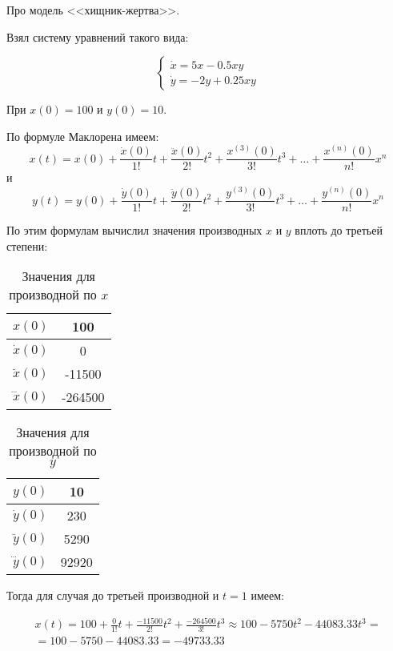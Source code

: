 \documentclass[11pt,reqno]{amsart}
\begin{document}
Про модель <<хищник-жертва>>.

Взял систему уравнений такого вида:

\begin{equation}\label{eq1}
  \begin{cases}
    \dot x = 5x - 0.5 x y \\
    \dot y = -2y+0.25xy
  \end{cases}
\end{equation}

При $x(0) = 100$ и $y(0) = 10$.

По формуле Маклорена имеем:
 $$x(t) = x(0) + \frac {\dot x(0)} {1!} t + \frac {\ddot x(0)} {2!} t^2 + \frac {x^{(3)}(0)} {3!}t^3 + \ldots + \frac {x^{(n)}(0)} {n!} x^n$$
и
$$y(t) = y(0) + \frac {\dot y(0)} {1!} t + \frac {\ddot y(0)} {2!} t^2 + \frac {y^{(3)}(0)} {3!}t^3 + \ldots + \frac {y^{(n)}(0)} {n!} x^n$$

По этим формулам вычислил значения производных $x$ и $y$ вплоть до третьей степени:

\begin{table}[h]
  \begin{tabular}{|c|c|}
    \hline
    $x(0)$ & 100 \\ \hline
    $\dot x(0)$ & 0 \\ \hline
    $\ddot x(0)$ & -11500 \\ \hline
    $\dddot x(0)$ & -264500 \\ \hline
  \end{tabular}
\caption{Значения для производной по $x$}
\end{table}

\begin{table}[h]
  \begin{tabular}{|c|c|}
    \hline
    $y(0)$ & 10 \\ \hline
    $\dot y(0)$ & 230 \\ \hline
    $\ddot y(0)$ & 5290 \\ \hline
    $\dddot y(0)$ & 92920 \\ \hline
  \end{tabular}
\caption{Значения для производной по $y$}
\end{table}

Тогда для случая до третьей производной и $t = 1$ имеем:

\begin{equation}
\begin{gathered}
x(t) = 100 + \frac {0}{1!}t + \frac {-11500} {2!} t^2 + \frac {-264500} {3!}t^3 \approx 100-5750t^2-44083.33t^3 = \\
= 100-5750-44083.33 = -49733.33
\end{gathered}
\end{equation}
\end{document}

